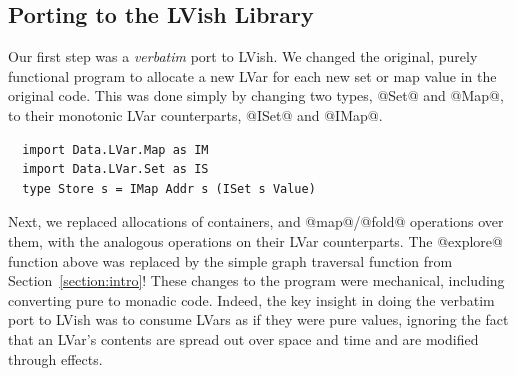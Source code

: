

\subsection{Porting to the LVish Library}
Our first step was a {\em verbatim} port to LVish.  We changed the original, purely
functional program to allocate a new LVar for each new
set or map value in the original code.
This was done simply by changing two types, @Set@ and @Map@, to their
monotonic LVar counterparts, @ISet@ and @IMap@.



\begin{lstlisting}
  import Data.LVar.Map as IM
  import Data.LVar.Set as IS
  type Store s = IMap Addr s (ISet s Value)
\end{lstlisting}
%
Next, we replaced allocations of containers, and @map@/@fold@ operations
over them, with the analogous operations on their LVar counterparts.
%
The @explore@ function above was replaced by the
simple graph traversal function from Section~\ref{section:intro}!  
%
These changes to the program were mechanical, including converting pure
to monadic code.
Indeed, the key insight in doing the verbatim port to LVish
was to consume LVars as if they were pure
values, ignoring the fact that an LVar's contents are spread out over space and time and
are modified through effects.

